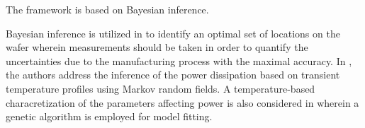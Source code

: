 The framework is based on Bayesian inference.

Bayesian inference is utilized in \cite{zhang2010} to identify an optimal set of locations on the wafer wherein measurements should be taken in order to quantify the uncertainties due to the manufacturing process with the maximal accuracy. In \cite{paek2012}, the authors address the inference of the power dissipation based on transient temperature profiles using Markov random fields. A temperature-based characretization of the parameters affecting power is also considered in \cite{mesa-martinez2007} wherein a genetic algorithm is employed for model fitting.
